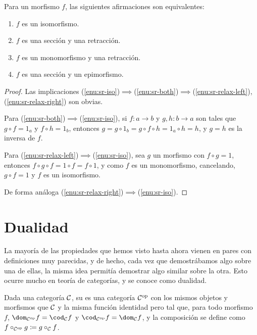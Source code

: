 \begin{proposition}
  Para un morfismo $f$, las siguientes afirmaciones son equivalentes:
  \begin{enumerate}
  \item \label{enu:sr-iso} $f$ es un isomorfismo.
  \item \label{enu:sr-both} $f$ es una sección y una retracción.
  \item \label{enu:sr-relax-left} $f$ es un monomorfismo y una retracción.
  \item \label{enu:sr-relax-right} $f$ es una sección y un epimorfismo.
  \end{enumerate}
\end{proposition}
\begin{proof}
  Las implicaciones
  (\ref{enu:sr-iso})$\implies$(\ref{enu:sr-both})$\implies$(\ref{enu:sr-relax-left}),
  (\ref{enu:sr-relax-right}) son obvias.

  Para (\ref{enu:sr-both})$\implies$(\ref{enu:sr-iso}), si $f:a\to b$ y
  $g,h:b\to a$ son tales que $g\circ f=1_a$ y $f\circ h=1_b$, entonces
  $g=g\circ 1_b=g\circ f\circ h=1_a\circ h=h$, y $g=h$ es la inversa de $f$.

  Para (\ref{enu:sr-relax-left})$\implies$(\ref{enu:sr-iso}), sea $g$ un
  morfismo con $f\circ g=1$, entonces $f\circ g\circ f=1\circ f=f\circ 1$, y
  como $f$ es un monomorfismo, cancelando, $g\circ f=1$ y $f$ es un
  isomorfismo.

  De forma análoga (\ref{enu:sr-relax-right})$\implies$(\ref{enu:sr-iso}).
\end{proof}

\section{Dualidad}

La mayoría de las propiedades que hemos visto hasta ahora vienen en pares con
definiciones muy parecidas, y de hecho, cada vez que demostrábamos algo sobre
una de ellas, la misma idea permitía demostrar algo similar sobre la otra. Esto
ocurre mucho en teoría de categorías, y se conoce como dualidad.

\begin{definition}
  Dada una categoría $\mathcal{C}$, su  es una categoría
  $\mathcal{C}^{\mathrm{op}}$ con los mismos objetos y morfismos que $\mathcal{C}$ y la misma función
  identidad pero tal que, para todo morfismo $f$,
  $\dom_{\dual{\cC}}{f}=\cod_{\cC}{f}$ y $\cod_{\dual{\cC}}{f}=\dom_{\cC}{f}$, y
  la composición se define como $f\circ_{\mathcal{C}^{\mathrm{op}}}g\coloneqq g\circ_{\mathcal{C}}f$.
\end{definition}

